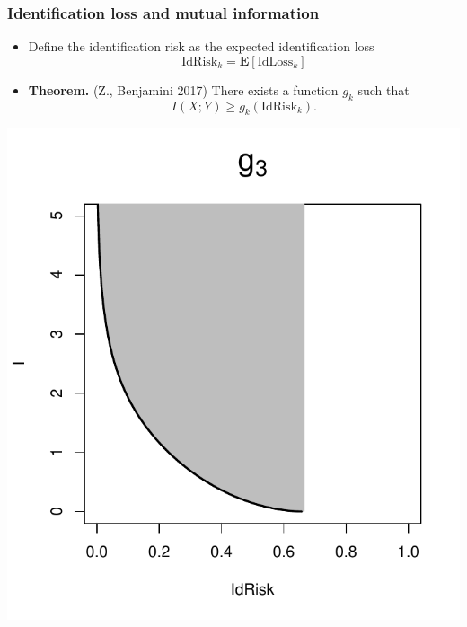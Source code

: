 \documentclass{beamer}
\newcommand{\E}{\textbf{E}}
\begin{document}
\begin{frame}
\frametitle{Identification loss and mutual information}
\begin{itemize}
\item Define the identification risk as the expected identification loss
\[
\text{IdRisk}_k = \E[\text{IdLoss}_k]
\]
\item \textbf{Theorem.} (Z., Benjamini 2017) There exists a function $g_k$ such that
\[I(X; Y) \geq g_k(\text{IdRisk}_k).\]
\end{itemize}
\begin{center}
\includegraphics[scale = 0.4]{../idloss/g3.pdf}

\end{center}
\end{frame}
\end{document}
